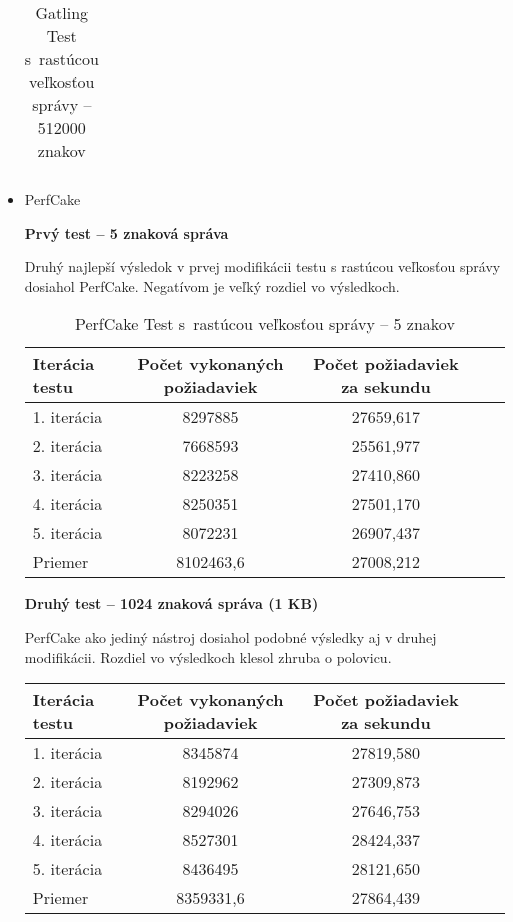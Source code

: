 \documentclass[12pt,oneside,final]{fithesis-utf8}
\begin{document}
\begin{itemize}
\begin{table}[H]
\begin{center}
\begin{tabular}{ | l | c | c | c | c |}
\end{tabular}
\end{center}
\caption{Gatling Test s~rastúcou veľkosťou správy -- 512000 znakov}
\end{table}


\item PerfCake

\textbf{Prvý test -- 5 znaková správa}

Druhý najlepší výsledok v prvej modifikácii testu s rastúcou veľkosťou správy dosiahol PerfCake. Negatívom je veľký rozdiel vo výsledkoch.

\begin{table}[H]
\begin{center}
\begin{tabular}{ | l | c | c | c | c |}
		\hline
		 \textbf{Iterácia testu} & \textbf{Počet vykonaných požiadaviek} & \textbf{Počet požiadaviek za sekundu} \\ \hline
		 1. iterácia & 8297885 & 27659,617 \\ \hline
		 2. iterácia & 7668593 & 25561,977 \\ \hline
		 3. iterácia & 8223258 & 27410,860 \\ \hline
		 4. iterácia & 8250351 & 27501,170 \\ \hline
		 5. iterácia & 8072231 & 26907,437 \\ \hline
		 Priemer & 8102463,6 & 27008,212 \\ \hline
		 
\end{tabular}
\end{center}
\caption{PerfCake Test s~rastúcou veľkosťou správy -- 5 znakov}
\end{table}


\textbf{Druhý test -- 1024 znaková správa (1 KB)}

PerfCake ako jediný nástroj dosiahol podobné výsledky aj v druhej modifikácii. Rozdiel vo výsledkoch klesol zhruba o polovicu.

\begin{table}[H]
\begin{center}
\begin{tabular}{ | l | c | c | c | c |}
		\hline
		 \textbf{Iterácia testu} & \textbf{Počet vykonaných požiadaviek} & \textbf{Počet požiadaviek za sekundu} \\ \hline
		 1. iterácia & 8345874 & 27819,580 \\ \hline
		 2. iterácia & 8192962 & 27309,873 \\ \hline
		 3. iterácia & 8294026 & 27646,753 \\ \hline
		 4. iterácia & 8527301 & 28424,337 \\ \hline
		 5. iterácia & 8436495 & 28121,650 \\ \hline
		 Priemer & 8359331,6 & 27864,439 \\ \hline
		 

\end{tabular}
\end{center}
\end{table}
\end{itemize}
\end{document}
